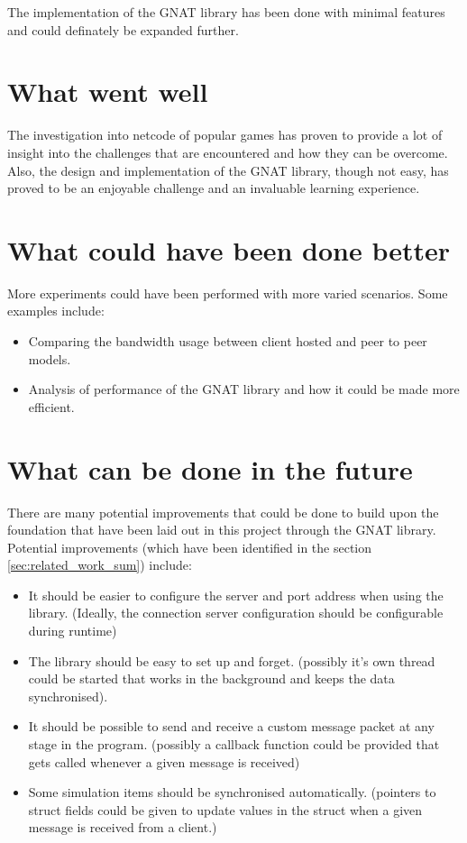 The implementation of the GNAT library has been done with minimal features and could definately be expanded further.


\section{What went well}
The investigation into netcode of popular games has proven to provide a lot of insight into the challenges that are encountered and how they can be overcome. Also, the design and implementation of the GNAT library, though not easy, has proved to be an enjoyable challenge and an invaluable learning experience.


\section{What could have been done better}
More experiments could have been performed with more varied scenarios. Some examples include:
\begin{itemize}
\item Comparing the bandwidth usage between client hosted and peer to peer models.
\item Analysis of performance of the GNAT library and how it could be made more efficient.
\end{itemize}


\section{What can be done in the future}
There are many potential improvements that could be done to build upon the foundation that have been laid out in this project through the GNAT library. Potential improvements (which have been identified in the section \ref{sec:related_work_sum}) include:
\begin{itemize}
\item It should be easier to configure the server and port address when using the library. (Ideally, the connection server configuration should be configurable during runtime)
\item The library should be easy to set up and forget. (possibly it's own thread could be started that works in the background and keeps the data synchronised).
\item It should be possible to send and receive a custom message packet at any stage in the program. (possibly a callback function could be provided that gets called whenever a given message is received)
\item Some simulation items should be synchronised automatically. (pointers to struct fields could be given to update values in the struct when a given message is received from a client.)
\end{itemize}
